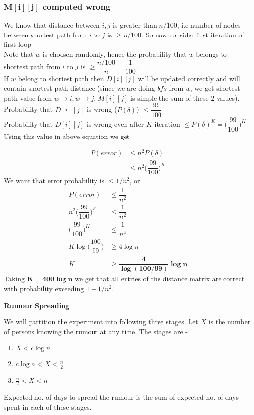 \documentclass[a4paper]{article}
\newcommand{\V}[1]{\boldsymbol{#1}}
\begin{document}
\subsubsection*{$\V{M[i][j]}$ computed wrong}
We know that distance between $i, j$ is greater than $n/100$, i.e number of nodes between shortest path from $i$ to $j$ is $\geq n/100$.
So now consider first iteration of first loop. \\
Note that $w$ is choosen randomly, hence the probability that $w$ belongs to shortest path from $i$ to $j$ is $\geq \dfrac{n/100}{n} = \dfrac{1}{100}$. \\
If $w$ belong to shortest path then $D[i][j]$ will be updated correctly and will contain shortest path distance (since we are doing $bfs$ from $w$, we get shortest path value from $w\rightarrow i, w\rightarrow j$, $M[i][j]$ is simple the sum of these $2$ values).\\
Probability that $D[i][j]$ is wrong ($P(\delta)$) $\leq \dfrac{99}{100}$ \\
Probability that $D[i][j]$ is wrong even after $K$ iteration $\leq P(\delta)^{K} = \Bigg( \dfrac{99}{100} \Bigg)^K$ \\
Using this value in above equation we get

\begin{align*}
P(error) &\leq n^2 P(\delta) \\
		 &\leq n^2 \Bigg( \dfrac{99}{100} \Bigg)^K
\end{align*}
We want that error probability is $\leq 1/n^2$, or
\begin{align*}
P(error) &\leq \dfrac{1}{n^2} \\
n^2 \Bigg( \dfrac{99}{100} \Bigg)^K &\leq \dfrac{1}{n^2} \\
\Bigg( \dfrac{99}{100} \Bigg)^K &\leq \dfrac{1}{n^4}\\
K\log \Bigg( \dfrac{100}{99}\Bigg) &\geq 4\log n \\
K &\geq \V{\dfrac{4}{\log(100/99)} \log n}
\end{align*}
Taking $\V{K = 400\log n}$ we get that all entries of the distance matrix are correct with probability exceeding $1 - 1/n^2$.
\pagebreak

\begin{question}[]
\textbf{Rumour Spreading}
\end{question}
We will partition the experiment into following three stages. Let $X$ is the number of persons knowing the rumour at any time.
The stages are - 
\begin{enumerate}
    \item $X < c\log n$
    \item $c\log n < X < \frac{n}{2}$
    \item $\frac{n}{2} < X < n$
\end{enumerate}
Expected no. of days to spread the rumour is the sum of expected no. of days spent in each of these stages.
\end{document}
